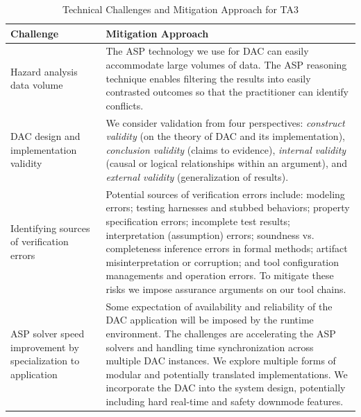 \begin{table}
\caption{Technical Challenges and Mitigation Approach for TA3}
  \centering 
{\footnotesize
\begin{tabular}{|m{1.3in}|m{4.85in}|} 
\hline
\textbf{Challenge} & \textbf{Mitigation Approach} 
\\\hline

Hazard analysis data volume  & 
The ASP technology we use for DAC can easily accommodate large volumes of data.  The ASP reasoning technique enables filtering the results into easily contrasted outcomes so that the practitioner can identify conflicts.\\ \hline

DAC design and implementation validity & 
We consider validation from four perspectives: {\em construct validity\/} (on the theory of DAC and its implementation), {\em conclusion validity\/} (claims to evidence), {\em  internal validity\/} (causal or logical relationships within an argument), and {\em external validity\/} (generalization of results).  
\\ \hline

Identifying sources of verification errors &
Potential sources of verification errors include: modeling errors; testing harnesses and stubbed behaviors; property specification errors; incomplete test results; interpretation (assumption) errors; soundness vs. completeness inference errors in formal methods; artifact misinterpretation or corruption; and tool configuration managements and operation errors. To mitigate these risks we impose assurance arguments on our tool chains.  
\\ \hline

ASP solver speed improvement by specialization to application &
Some expectation of availability and reliability of the DAC application will be imposed by the runtime environment. The challenges are accelerating the ASP solvers and handling time synchronization across multiple DAC instances.
We explore multiple forms of modular and potentially translated implementations.  
We incorporate the DAC into the system design, potentially including hard real-time and safety downmode features. \\ \hline
\end{tabular}
}
\label{tab:ta3:risk}
\end{table}


